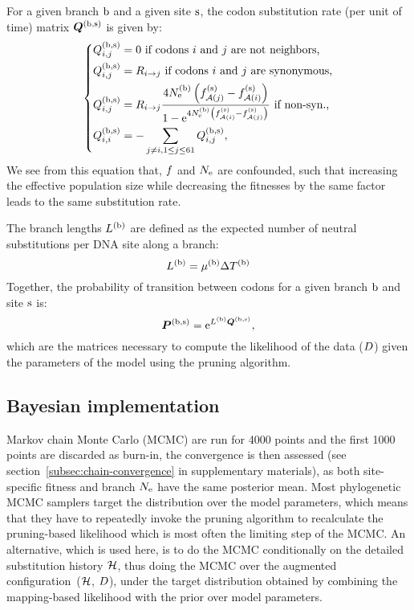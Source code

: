 For a given branch $\text{b}$ and a given site $\text{s}$, the codon substitution rate (per unit of time) matrix $\bm{Q}^{(\text{b}, \text{s})}$ is given by:
\begin{equation}
    \label{eq:subrates}
    \begin{dcases}
        \submatrix\branchsiteexp_{\itoj} = 0\text{ if codons $\ci$ and $\cj$ are not neighbors,} \\
        \submatrix\branchsiteexp_{\itoj} = \mutmatrix_{\nucitoj}\text{ if codons $\ci$ and $\cj$ are synonymous,} \\
        \submatrix\branchsiteexp_{\itoj} = \mutmatrix_{\nucitoj} \dfrac{4\Ne\branchexp \left({\fitj\siteexp - \fiti\siteexp}\right)}{{1 - \e^{4\Ne\branchexp\left({\fiti\siteexp - \fitj\siteexp}\right)} }} \text{ if non-syn.,}\\
        \submatrix\branchsiteexp_{\ci, \ci} = - \sum\limits_{ \cj \neq \ci, \jSetCodon} \submatrix\branchsiteexp_{\itoj},
    \end{dcases}
\end{equation}
We see from this equation that, $f$ and $N_{\text{e}}$ are confounded, such that increasing the effective population size while decreasing the fitnesses by the same factor leads to the same substitution rate.

The branch lengths $L^{(\text{b})}$ are defined as the expected number of neutral substitutions per \acrshort{DNA} site along a branch:
\begin{equation}
    \label{eq:branchlength}
    \branchlength\branchexp = \mu\branchexp \branchtime\branchexp
\end{equation}
Together, the probability of transition between codons for a given branch $\text{b}$ and site $\text{s}$ is:
\begin{equation}
    \label{eq:Probmatrix}
    \Probmatrix\branchsiteexp = \e^{\branchlength\branchexp \Submatrix\branchsiteexp},
\end{equation}
which are the matrices necessary to compute the likelihood of the data ($D$) given the parameters of the model using the pruning algorithm.

\subsection{Bayesian implementation}
\label{sec:Bayesian}
Markov chain Monte Carlo (\acrshort{MCMC}) are run for 4000 points and the first 1000 points are discarded as burn-in, the convergence is then assessed (see section~\ref{subsec:chain-convergence} in supplementary materials), as both site-specific fitness and branch $N_{\text{e}}$ have the same posterior mean.
Most phylogenetic \acrshort{MCMC} samplers target the distribution over the model parameters, which means that they have to repeatedly invoke the pruning algorithm to recalculate the pruning-based likelihood which is most often the limiting step of the \acrshort{MCMC}.
An alternative, which is used here, is to do the \acrshort{MCMC} conditionally on the detailed substitution history $\mathcal{H}$, thus doing the \acrshort{MCMC} over the augmented configuration~($\mathcal{H}$, $D$), under the target distribution obtained by combining the mapping-based likelihood with the prior over model parameters.

